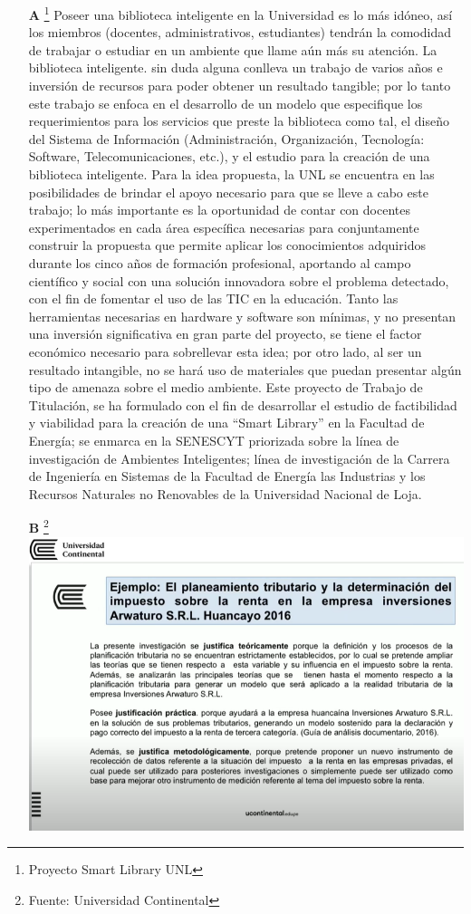 \small{
\begin{itemize}
    \item[\textbf{A}] \footnote{Proyecto Smart Library UNL} Poseer una biblioteca inteligente en la Universidad es lo más idóneo, así los miembros (docentes, administrativos, estudiantes) tendrán la comodidad de trabajar o estudiar en un ambiente que llame aún más su atención.
    La biblioteca inteligente. sin duda alguna conlleva un trabajo de varios años e inversión de recursos para poder obtener un resultado tangible; por lo tanto este trabajo se enfoca en el desarrollo de un modelo que especifique los requerimientos para los servicios que preste la biblioteca como tal, el diseño del Sistema de Información (Administración, Organización, Tecnología: Software, Telecomunicaciones, etc.), y el estudio para la creación de una biblioteca inteligente.
    Para la idea propuesta, la UNL se encuentra en las posibilidades de brindar el apoyo necesario para que se lleve a cabo este trabajo; lo más importante es la oportunidad de contar con docentes experimentados en cada área específica necesarias para conjuntamente construir la propuesta que permite aplicar los conocimientos adquiridos durante los cinco años de formación profesional, aportando al campo científico y social con una solución innovadora sobre el problema detectado, con el fin de fomentar el uso de las TIC en la educación. 
    Tanto las herramientas necesarias en hardware y software son mínimas, y no presentan una inversión significativa en gran parte del proyecto, se tiene el factor económico necesario para sobrellevar esta idea; por otro lado, al ser un resultado intangible, no se hará uso de materiales que puedan presentar algún tipo de amenaza sobre el medio ambiente. 
    Este proyecto de Trabajo de Titulación, se ha formulado con el fin de desarrollar el estudio de factibilidad y viabilidad para la creación de una “Smart Library” en la Facultad de Energía; se enmarca en la SENESCYT priorizada sobre la línea de investigación de Ambientes Inteligentes; línea de investigación de la Carrera de Ingeniería en Sistemas de la Facultad de Energía las Industrias y los Recursos Naturales no Renovables de la Universidad Nacional de Loja. 
    \item[\textbf{B}] \footnote{Fuente: Universidad Continental}
   \includegraphics[scale=0.8]{img/ejempl2.png}
    
\end{itemize}
}

